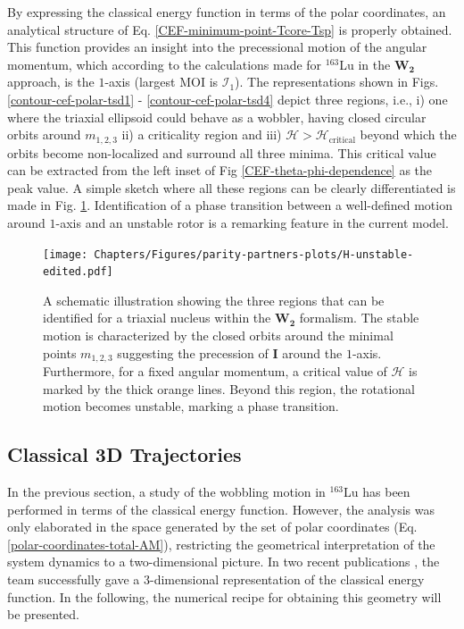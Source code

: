 By expressing the classical energy function in terms of the polar coordinates, an analytical structure of Eq. \ref{CEF-minimum-point-Tcore-Tsp} is properly obtained. This function provides an insight into the precessional motion of the angular momentum, which according to the calculations made for $^{163}$Lu in the $\mathbf{W_2}$ approach, is the $1$-axis (largest MOI is $\mathcal{I}_1$). The representations shown in Figs. \ref{contour-cef-polar-tsd1} - \ref{contour-cef-polar-tsd4} depict three regions, i.e., i) one where the triaxial ellipsoid could behave as a wobbler, having closed circular orbits around $m_{1,2,3}$ ii) a criticality region and iii) $\mathcal{H}>\mathcal{H}_\text{critical}$ beyond which the orbits become non-localized and surround all three minima. This critical value can be extracted from the left inset of Fig \ref{CEF-theta-phi-dependence} as the peak value. A simple sketch where all these regions can be clearly differentiated is made in Fig. \ref{fig-H-unstable-sketch}. Identification of a phase transition between a well-defined motion around $1$-axis and an unstable rotor is a remarking feature in the current model.
\begin{figure}
    \centering
    \texttt{[image: Chapters/Figures/parity-partners-plots/H-unstable-edited.pdf]}
    \caption{A schematic illustration showing the three regions that can be identified for a triaxial nucleus within the $\mathbf{W_2}$ formalism. The stable motion is characterized by the closed orbits around the minimal points $m_{1,2,3}$ suggesting the precession of $\mathbf{I}$ around the $1$-axis. Furthermore, for a fixed angular momentum, a critical value of $\mathcal{H}$ is marked by the thick orange lines. Beyond this region, the rotational motion becomes unstable, marking a phase transition.}
    \label{fig-H-unstable-sketch}
\end{figure}

\subsection{Classical 3D Trajectories}

In the previous section, a study of the wobbling motion in $^{163}$Lu has been performed in terms of the classical energy function. However, the analysis was only elaborated in the space generated by the set of polar coordinates (Eq. \ref{polar-coordinates-total-AM}), restricting the geometrical interpretation of the system dynamics to a two-dimensional picture. In two recent publications \cite{poenaru2021extensive1,poenaru2021extensive2}, the team successfully gave a $3$-dimensional representation of the classical energy function. In the following, the numerical recipe for obtaining this geometry will be presented.

